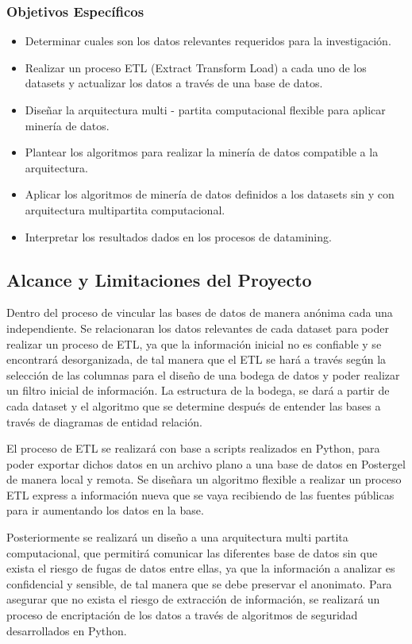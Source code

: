 \documentclass[a4paper, 11pt, oneside]{article}
\theoremstyle{definition}
\theoremstyle{remark}
\begin{document}
\subsubsection{Objetivos Específicos}
\begin{itemize}
\item Determinar cuales son los datos relevantes requeridos para la investigación.
\item Realizar un proceso ETL (Extract Transform Load) a cada uno de los datasets y actualizar los datos a través de una base de datos.
\item Diseñar la arquitectura multi - partita computacional flexible para aplicar minería de datos.
\item Plantear los algoritmos para realizar la minería de datos compatible a la arquitectura.
\item Aplicar los algoritmos de minería de datos definidos a los datasets sin y con arquitectura multipartita computacional.
\item Interpretar los resultados dados en los procesos de datamining.

\end{itemize}

\subsection{Alcance y Limitaciones del Proyecto}

Dentro del proceso de vincular las bases de datos de manera anónima cada una independiente. Se relacionaran los datos relevantes de cada dataset para poder realizar un proceso de ETL, ya que la información inicial no es confiable y se encontrará desorganizada, de tal manera que el ETL se hará a través según la selección de las columnas para el diseño de una bodega de datos y poder realizar un filtro inicial de información. La estructura de la bodega, se dará a partir de cada dataset y el algoritmo que se determine después de entender las bases a través de diagramas de entidad relación.

El proceso de ETL se realizará con base a scripts realizados en Python, para poder exportar dichos datos en un archivo plano a una base de datos en Postergel de manera local y remota. Se diseñara un algoritmo flexible a realizar un proceso ETL express a información nueva que se vaya recibiendo de las fuentes públicas para ir aumentando los datos en la base.

Posteriormente se realizará un diseño a una arquitectura multi partita computacional, que permitirá comunicar las diferentes base de datos sin que exista el riesgo de fugas de datos entre ellas, ya que la información a analizar es confidencial y sensible, de tal manera que se debe preservar el anonimato. Para asegurar que no exista el riesgo de extracción de información, se realizará un proceso de encriptación de los datos a través de algoritmos de seguridad desarrollados en Python.
\end{document}
